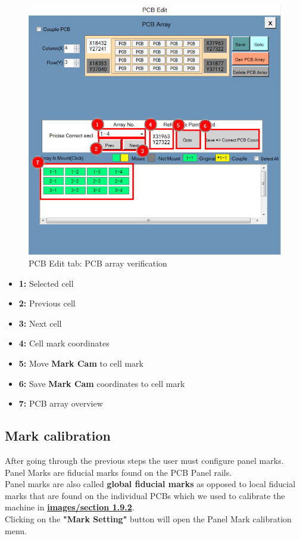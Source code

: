 \documentclass[a4paper,10pt]{report}
\begin{document}
\begin{figure}[!htb]
 \centering
 \includegraphics[width=1\textwidth]{images/scrot14.png}
 \caption{PCB Edit tab: PCB array verification}
\end{figure}
\begin{itemize}
 \item \textbf{1: } Selected cell
 \item \textbf{2: } Previous cell
 \item \textbf{3: } Next cell
 \item \textbf{4: } Cell mark coordinates
 \item \textbf{5: } Move \textbf{Mark Cam} to cell mark
 \item \textbf{6: } Save \textbf{Mark Cam} coordinates to cell mark
 \item \textbf{7: } PCB array overview
\end{itemize}
\newpage
\subsection{Mark calibration}
\label{sec:1.9.4}
After going through the previous steps the user must configure panel marks. Panel Marks are fiducial marks found on the PCB Panel rails.\\

Panel marks are also called \textbf{global fiducial marks} as opposed to local fiducial marks that are found on the individual PCBs which we used to calibrate the machine in \textbf{\hyperref[sec:1.9.2]{images/section 1.9.2}}.\\
Clicking on the \textbf{"Mark Setting"} button will open the Panel Mark calibration menu.\\
\end{document}
